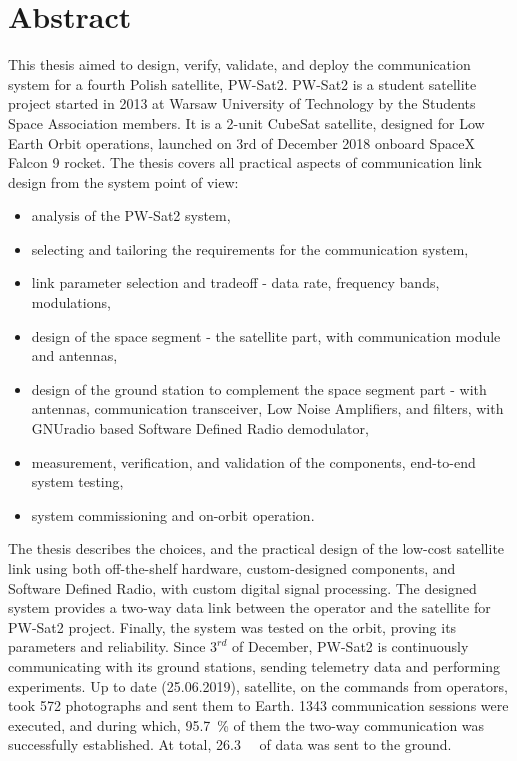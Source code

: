 \chapter{Abstract}

This thesis aimed to design, verify, validate, and deploy the communication system for a fourth Polish satellite, PW-Sat2. PW-Sat2 is a student satellite project started in 2013 at Warsaw University of Technology by the Students Space Association members. It is a 2-unit CubeSat satellite, designed for Low Earth Orbit operations, launched on 3rd of December 2018 onboard SpaceX Falcon 9 rocket.
The thesis covers all practical aspects of communication link design from the system point of view:
\begin{itemize}
    \setlength\itemsep{0em}
    \item analysis of the PW-Sat2 system,
    \item selecting and tailoring the requirements for the communication system,
    \item link parameter selection and tradeoff - data rate, frequency bands, modulations,
    \item design of the space segment - the satellite part, with communication module and antennas,
    \item design of the ground station to complement the space segment part - with antennas, communication transceiver, Low Noise Amplifiers, and filters, with GNUradio based Software Defined Radio demodulator,
    \item measurement, verification, and validation of the components, end-to-end system testing,
    \item system commissioning and on-orbit operation.
\end{itemize}
The thesis describes the choices, and the practical design of the low-cost satellite link using both off-the-shelf hardware, custom-designed components, and Software Defined Radio, with custom digital signal processing. The designed system provides a two-way data link between the operator and the satellite for PW-Sat2 project. Finally, the system was tested on the orbit, proving its parameters and reliability. Since $3^{rd}$ of December, PW-Sat2 is continuously communicating with its ground stations, sending telemetry data and performing experiments. Up to date (25.06.2019), satellite, on the commands from operators, took \si{572} photographs and sent them to Earth. \si{1343} communication sessions were executed, and during which, \SI{95.7}{\percent} of them the two-way communication was successfully established. At total, \SI{26.3}{\mega\byte} of data was sent to the ground.

